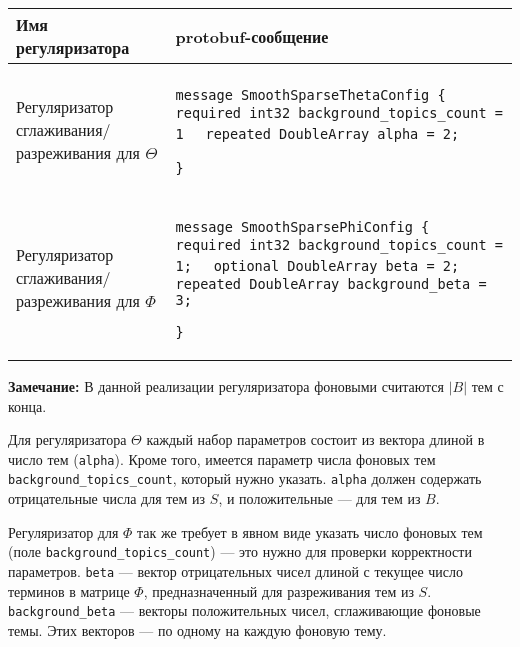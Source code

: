 \begin{tabular}[t]{|p{14em}|p{26em}|}
\hline
\vspace{2pt} \textbf{Имя регуляризатора} \vspace{4pt} &
\vspace{2pt} \textbf{protobuf-сообщение} \vspace{4pt} \\

\hline
\vspace{4pt}

Регуляризатор сглаживания/ разреживания для $\Theta$ & 
\vspace{4pt}

\verb|message SmoothSparseThetaConfig {|
\verb|  required int32 background_topics_count = 1|
\verb|  repeated DoubleArray alpha = 2;|

\verb|}|
\vspace{4pt}

\\
\hline
\vspace{4pt}

Регуляризатор сглаживания/ разреживания для $\Phi$ &
\vspace{4pt}

\verb|message SmoothSparsePhiConfig {|
\verb|  required int32 background_topics_count = 1;|
\verb|  optional DoubleArray beta = 2;|
\verb|  repeated DoubleArray background_beta = 3;|

\verb|}|
\vspace{4pt}

\\
\hline
\end{tabular}

\vspace{10pt}

{\bf Замечание:} В данной реализации регуляризатора фоновыми считаются $|B|$ тем с конца.

Для регуляризатора $\Theta$ каждый набор параметров состоит из вектора длиной в число тем (\verb|alpha|). Кроме того, имеется параметр числа фоновых тем \verb|background_topics_count|, который нужно указать. \verb|alpha| должен содержать отрицательные числа для тем из $S$, и положительные --- для тем из $B$.

Регуляризатор для $\Phi$ так же требует в явном виде указать число фоновых тем (поле \verb|background_topics_count|) --- это нужно для проверки корректности параметров. \verb'beta' --- вектор отрицательных чисел длиной с текущее число терминов в матрице $\Phi$, предназначенный для разреживания тем из $S$. \verb|background_beta| --- векторы положительных чисел, сглаживающие фоновые темы. Этих векторов --- по одному на каждую фоновую тему.

